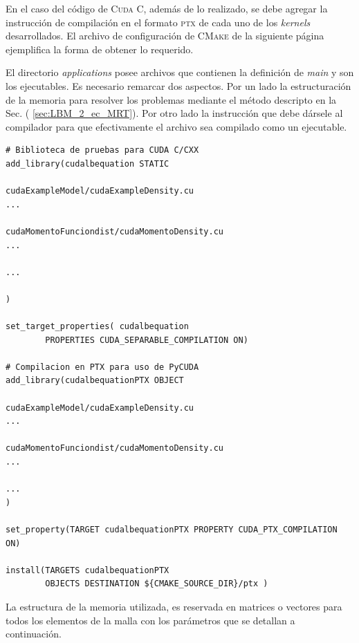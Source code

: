 En el caso del código de \textsc{Cuda C}, además de lo realizado, se debe agregar la instrucción de compilación en el formato \textsc{ptx} de cada uno de los \textit{kernels} desarrollados. El archivo de configuración de \textsc{CMake} de la siguiente página ejemplifica la forma de obtener lo requerido.

El directorio \textit{applications} posee archivos que contienen la definición de \textit{main} y son los ejecutables. Es necesario remarcar dos aspectos. Por un lado la estructuración de la memoria para resolver los problemas mediante el método descripto en la Sec. ( \ref{sec:LBM_2_ec_MRT}). Por otro lado la instrucción que debe dársele al compilador para que efectivamente el archivo sea compilado como un ejecutable.

\newpage
{\footnotesize
	\begin{frame}{}
		\begin{lstlisting}[frame=single]
# Biblioteca de pruebas para CUDA C/CXX
add_library(cudalbequation STATIC

cudaExampleModel/cudaExampleDensity.cu
...

cudaMomentoFunciondist/cudaMomentoDensity.cu
...

...

)

set_target_properties( cudalbequation 
		PROPERTIES CUDA_SEPARABLE_COMPILATION ON)

# Compilacion en PTX para uso de PyCUDA
add_library(cudalbequationPTX OBJECT

cudaExampleModel/cudaExampleDensity.cu
...

cudaMomentoFunciondist/cudaMomentoDensity.cu
...

...
)

set_property(TARGET cudalbequationPTX PROPERTY CUDA_PTX_COMPILATION ON)

install(TARGETS cudalbequationPTX
		OBJECTS DESTINATION ${CMAKE_SOURCE_DIR}/ptx )

		\end{lstlisting}
		
	\end{frame}
}

La estructura de la memoria utilizada, es reservada en matrices o vectores para todos los elementos de la malla con los parámetros que se detallan a continuación.

